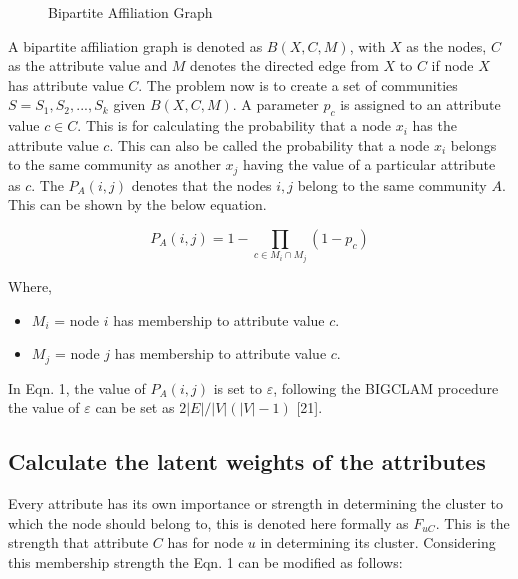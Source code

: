 \documentclass[conference]{IEEEtran}
\begin{document}
\begin{figure}[H]
\centering
{}
\caption{Bipartite Affiliation Graph}
\label{fig 1}
\end{figure}

A bipartite affiliation graph is denoted as $B(X,C,M)$,
with $X$ as the nodes, $C$ as the attribute value and $M$ denotes
the directed edge from $X$ to $C$ if node $X$ has attribute
value $C$. The problem now is to create a set of communities
$S = S_1, S_2, ..., S_k$ given $B(X,C,M)$. A parameter $p_c$ is
assigned to an attribute value $c \in C$. This is for calculating
the probability that a node $x_i$ has the attribute value $c$. This
can also be called the probability that a node $x_i$ belongs to
the same community as another $x_j$ having the value of a
particular attribute as $c$. The $P_A(i, j)$ denotes that the nodes
$i, j$ belong to the same community $A$. This can be shown by
the below equation.

\begin{equation}
P_A(i,j) = 1 - \prod_{c \in M_i \cap M_j} (1 - p_c)
\end{equation} 

Where,

\begin{itemize}
\item $M_i$ = node $i$ has membership to attribute value $c$.
\item $M_j$ = node $j$ has membership to attribute value $c$.\\
\end{itemize}

In Eqn. 1, the value of $P_A(i, j)$ is set to $\varepsilon$, following
the BIGCLAM procedure the value of $\varepsilon$ can be set as
$2|E|/|V|(|V| - 1)$ [21].


\subsection{Calculate the latent weights of the attributes}

Every attribute has its own importance or strength in
determining the cluster to which the node should belong to,
this is denoted here formally as $F_{uC}$. This is the strength
that attribute $C$ has for node $u$ in determining its cluster.
Considering this membership strength the Eqn. 1 can be
modified as follows:
\end{document}

